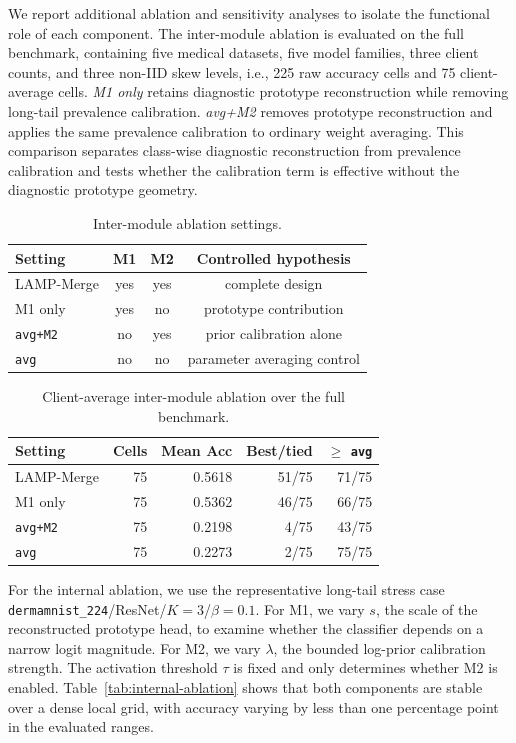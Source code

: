 We report additional ablation and sensitivity analyses to isolate the functional role of each component. The inter-module ablation is evaluated on the full benchmark, containing five medical datasets, five model families, three client counts, and three non-IID skew levels, i.e., 225 raw accuracy cells and 75 client-average cells. \textit{M1 only} retains diagnostic prototype reconstruction while removing long-tail prevalence calibration. \textit{avg+M2} removes prototype reconstruction and applies the same prevalence calibration to ordinary weight averaging. This comparison separates class-wise diagnostic reconstruction from prevalence calibration and tests whether the calibration term is effective without the diagnostic prototype geometry.

\begin{table}[t]
\centering
\caption{Inter-module ablation settings.}
\label{tab:ablation-setting}
\scriptsize
\setlength{\tabcolsep}{3.0pt}
\begin{tabular}{lccc}
\toprule
Setting & M1 & M2 & Controlled hypothesis \\
\midrule
LAMP-Merge & yes & yes & complete design \\
M1 only & yes & no & prototype contribution \\
\texttt{avg+M2} & no & yes & prior calibration alone \\
\texttt{avg} & no & no & parameter averaging control \\
\bottomrule
\end{tabular}
\end{table}

\begin{table}[t]
\centering
\caption{Client-average inter-module ablation over the full benchmark.}
\label{tab:ablation-detailed}
\scriptsize
\setlength{\tabcolsep}{2.6pt}
\begin{tabular}{lrrrr}
\toprule
Setting & Cells & Mean Acc & Best/tied & $\ge$ \texttt{avg} \\
\midrule
LAMP-Merge & 75 & 0.5618 & 51/75 & 71/75 \\
M1 only & 75 & 0.5362 & 46/75 & 66/75 \\
\texttt{avg+M2} & 75 & 0.2198 & 4/75 & 43/75 \\
\texttt{avg} & 75 & 0.2273 & 2/75 & 75/75 \\
\bottomrule
\end{tabular}
\end{table}

For the internal ablation, we use the representative long-tail stress case \texttt{dermamnist\_224}/ResNet/$K=3$/$\beta=0.1$. For M1, we vary $s$, the scale of the reconstructed prototype head, to examine whether the classifier depends on a narrow logit magnitude. For M2, we vary $\lambda$, the bounded log-prior calibration strength. The activation threshold $\tau$ is fixed and only determines whether M2 is enabled. Table~\ref{tab:internal-ablation} shows that both components are stable over a dense local grid, with accuracy varying by less than one percentage point in the evaluated ranges.

